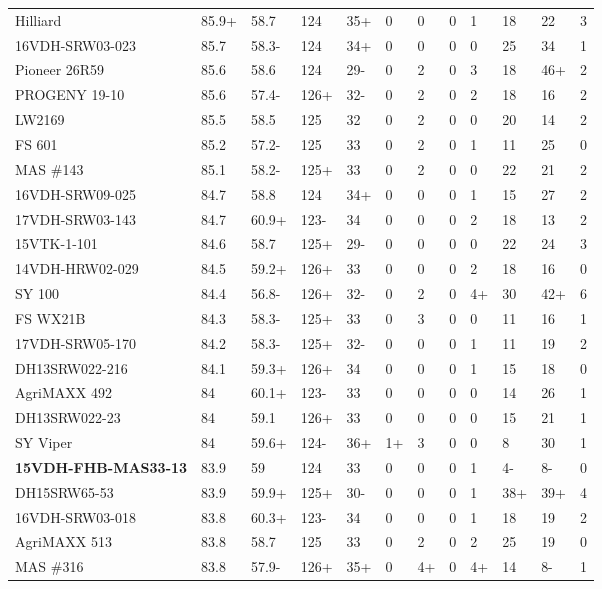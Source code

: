 \documentclass[12pt, letterpaper]{article}
\begin{document}
\begin{landscape}
\begin{ThreePartTable}
\begin{longtable}{llllllllllll}
  Hilliard & 85.9+ & 58.7 & 124 & 35+ & 0 & 0 & 0 & 1 & 18 & 22 & 3 \\ 
  16VDH-SRW03-023 & 85.7 & 58.3- & 124 & 34+ & 0 & 0 & 0 & 0 & 25 & 34 & 1 \\ 
  Pioneer 26R59 & 85.6 & 58.6 & 124 & 29- & 0 & 2 & 0 & 3 & 18 & 46+ & 2 \\ 
  PROGENY 19-10 & 85.6 & 57.4- & 126+ & 32- & 0 & 2 & 0 & 2 & 18 & 16 & 2 \\ 
  LW2169 & 85.5 & 58.5 & 125 & 32 & 0 & 2 & 0 & 0 & 20 & 14 & 2 \\ 
  FS 601 & 85.2 & 57.2- & 125 & 33 & 0 & 2 & 0 & 1 & 11 & 25 & 0 \\ 
  MAS \#143 & 85.1 & 58.2- & 125+ & 33 & 0 & 2 & 0 & 0 & 22 & 21 & 2 \\ 
  16VDH-SRW09-025 & 84.7 & 58.8 & 124 & 34+ & 0 & 0 & 0 & 1 & 15 & 27 & 2 \\ 
  17VDH-SRW03-143 & 84.7 & 60.9+ & 123- & 34 & 0 & 0 & 0 & 2 & 18 & 13 & 2 \\ 
  15VTK-1-101 & 84.6 & 58.7 & 125+ & 29- & 0 & 0 & 0 & 0 & 22 & 24 & 3 \\ 
  14VDH-HRW02-029 & 84.5 & 59.2+ & 126+ & 33 & 0 & 0 & 0 & 2 & 18 & 16 & 0 \\ 
  SY 100 & 84.4 & 56.8- & 126+ & 32- & 0 & 2 & 0 & 4+ & 30 & 42+ & 6 \\ 
  FS WX21B & 84.3 & 58.3- & 125+ & 33 & 0 & 3 & 0 & 0 & 11 & 16 & 1 \\ 
  17VDH-SRW05-170 & 84.2 & 58.3- & 125+ & 32- & 0 & 0 & 0 & 1 & 11 & 19 & 2 \\ 
  DH13SRW022-216 & 84.1 & 59.3+ & 126+ & 34 & 0 & 0 & 0 & 1 & 15 & 18 & 0 \\ 
  AgriMAXX 492 & 84 & 60.1+ & 123- & 33 & 0 & 0 & 0 & 0 & 14 & 26 & 1 \\ 
  DH13SRW022-23 & 84 & 59.1 & 126+ & 33 & 0 & 0 & 0 & 0 & 15 & 21 & 1 \\ 
  SY Viper & 84 & 59.6+ & 124- & 36+ & 1+ & 3 & 0 & 0 & 8 & 30 & 1 \\ 
  \textbf{15VDH-FHB-MAS33-13} & 83.9 & 59 & 124 & 33 & 0 & 0 & 0 & 1 & 4- & 8- & 0 \\ 
  DH15SRW65-53 & 83.9 & 59.9+ & 125+ & 30- & 0 & 0 & 0 & 1 & 38+ & 39+ & 4 \\ 
  16VDH-SRW03-018 & 83.8 & 60.3+ & 123- & 34 & 0 & 0 & 0 & 1 & 18 & 19 & 2 \\ 
  AgriMAXX 513 & 83.8 & 58.7 & 125 & 33 & 0 & 2 & 0 & 2 & 25 & 19 & 0 \\ 
  MAS \#316 & 83.8 & 57.9- & 126+ & 35+ & 0 & 4+ & 0 & 4+ & 14 & 8- & 1 \\ 

\end{longtable}
\end{ThreePartTable}
\end{landscape}
\end{document}

